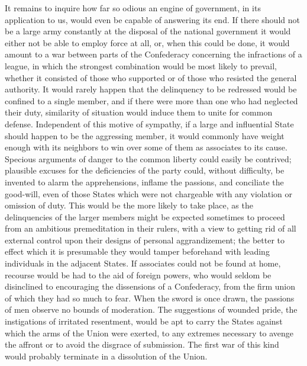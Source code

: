 It remains to inquire how far so odious an engine of government, in its application to us, would even be capable of answering its end. 
If there should not be a large army constantly at the disposal of the national government it would either not be able to employ force at all, or, when this could be done, it would amount to a war between parts of the Confederacy concerning the infractions of a league, in which the strongest combination would be most likely to prevail, whether it consisted of those who supported or of those who resisted the general authority. 
It would rarely happen that the delinquency to be redressed would be confined to a single member, and if there were more than one who had neglected their duty, similarity of situation would induce them to unite for common defense. 
Independent of this motive of sympathy, if a large and influential State should happen to be the aggressing member, it would commonly have weight enough with its neighbors to win over some of them as associates to its cause. 
Specious arguments of danger to the common liberty could easily be contrived; plausible excuses for the deficiencies of the party could, without difficulty, be invented to alarm the apprehensions, inflame the passions, and conciliate the good-will, even of those States which were not chargeable with any violation or omission of duty. 
This would be the more likely to take place, as the delinquencies of the larger members might be expected sometimes to proceed from an ambitious premeditation in their rulers, with a view to getting rid of all external control upon their designs of personal aggrandizement; the better to effect which it is presumable they would tamper beforehand with leading individuals in the adjacent States. 
If associates could not be found at home, recourse would be had to the aid of foreign powers, who would seldom be disinclined to encouraging the dissensions of a Confederacy, from the firm union of which they had so much to fear. 
When the sword is once drawn, the passions of men observe no bounds of moderation. 
The suggestions of wounded pride, the instigations of irritated resentment, would be apt to carry the States against which the arms of the Union were exerted, to any extremes necessary to avenge the affront or to avoid the disgrace of submission. 
The first war of this kind would probably terminate in a dissolution of the Union.

